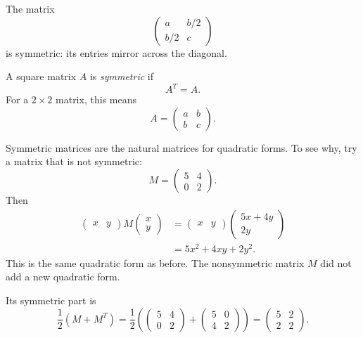 The matrix
\[
    \begin{pmatrix}
        a&b/2\\
        b/2&c
    \end{pmatrix}
\]
is symmetric: its entries mirror across the diagonal.

\begin{definition}
A square matrix \(A\) is \emph{symmetric} if
\[
    A^T=A.
\]
For a \(2\times2\) matrix, this means
\[
    A=
    \begin{pmatrix}
        a&b\\
        b&c
    \end{pmatrix}.
\]
\end{definition}

Symmetric matrices are the natural matrices for quadratic forms.  To see why, try a
matrix that is not symmetric:
\[
    M=
    \begin{pmatrix}
        5&4\\
        0&2
    \end{pmatrix}.
\]
Then
\[
\begin{aligned}
    \begin{pmatrix}x&y\end{pmatrix}
    M
    \begin{pmatrix}
        x\\y
    \end{pmatrix}
    &=
    \begin{pmatrix}x&y\end{pmatrix}
    \begin{pmatrix}
        5x+4y\\
        2y
    \end{pmatrix}\\
    &=
    5x^2+4xy+2y^2.
\end{aligned}
\]
This is the same quadratic form as before.  The nonsymmetric matrix \(M\) did not add
a new quadratic form.

Its symmetric part is
\[
    \frac12(M+M^T)
    =
    \frac12
    \left(
    \begin{pmatrix}
        5&4\\
        0&2
    \end{pmatrix}
    +
    \begin{pmatrix}
        5&0\\
        4&2
    \end{pmatrix}
    \right)
    =
    \begin{pmatrix}
        5&2\\
        2&2
    \end{pmatrix}.
\]

